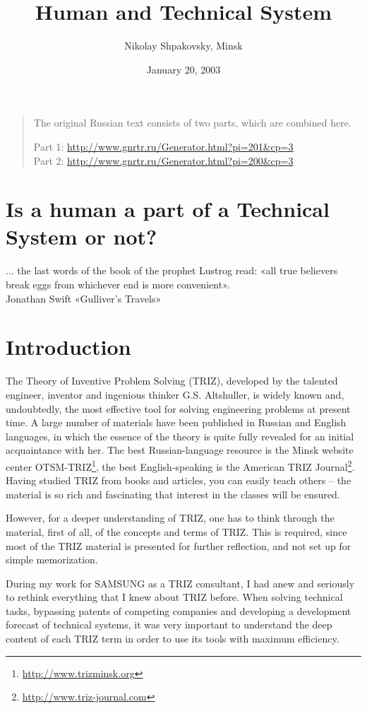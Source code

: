 \documentclass[11pt,a4paper]{article}
\title{Human and Technical System}
\author{Nikolay Shpakovsky, Minsk}
\date{January 20, 2003}
\begin{document}
\maketitle

\begin{quote}
  The original Russian text consists of two parts, which are combined here.
  
  Part 1: \url{http://www.gnrtr.ru/Generator.html?pi=201&cp=3}\\
  Part 2: \url{http://www.gnrtr.ru/Generator.html?pi=200&cp=3}
\end{quote}

\section*{Is a human a part of a Technical System or not?}
\begin{flushleft}
  ... the last words of the book of the prophet Lustrog read: «all true
  believers break eggs from whichever end is more convenient».\\
  Jonathan Swift «Gulliver's Travels»
\end{flushleft}

\section*{Introduction}
The Theory of Inventive Problem Solving (TRIZ), developed by the talented
engineer, inventor and ingenious thinker G.S. Altshuller, is widely known and,
undoubtedly, the most effective tool for solving engineering problems at
present time. A large number of materials have been published in Russian and
English languages, in which the essence of the theory is quite fully revealed
for an initial acquaintance with her. The best Russian-language resource is
the Minsk website center OTSM-TRIZ\footnote{\url{http://www.trizminsk.org}},
the best English-speaking is the American TRIZ
Journal\footnote{\url{http://www.triz-journal.com}}. Having studied TRIZ from
books and articles, you can easily teach others -- the material is so rich and
fascinating that interest in the classes will be ensured.

However, for a deeper understanding of TRIZ, one has to think through the
material, first of all, of the concepts and terms of TRIZ. This is required,
since most of the TRIZ material is presented for further reflection, and not
set up for simple memorization.

During my work for SAMSUNG as a TRIZ consultant, I had anew and seriously to
rethink everything that I knew about TRIZ before. When solving technical
tasks, bypassing patents of competing companies and developing a development
forecast of technical systems, it was very important to understand the deep
content of each TRIZ term in order to use its tools with maximum efficiency.
\end{document}
